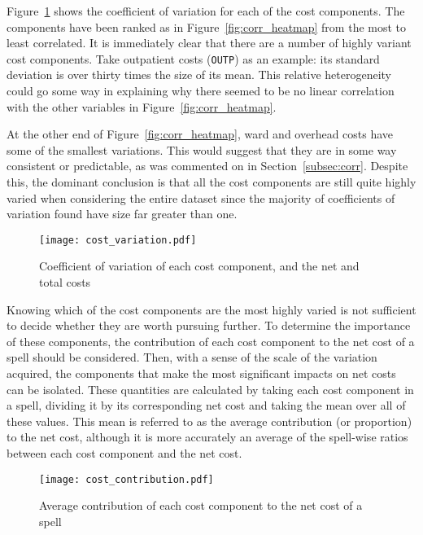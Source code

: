 Figure~\ref{fig:cost_variation} shows the coefficient of variation for each of
the cost components. The components have been ranked as in
Figure~\ref{fig:corr_heatmap} from the most to least correlated. It is
immediately clear that there are a number of highly variant cost components.
Take outpatient costs ({\tt OUTP}) as an example: its standard deviation is over
thirty times the size of its mean. This relative heterogeneity could go some way
in explaining why there seemed to be no linear correlation with the other
variables in Figure~\ref{fig:corr_heatmap}.

At the other end of Figure~\ref{fig:corr_heatmap}, ward and overhead costs have
some of the smallest variations. This would suggest that they are in some way
consistent or predictable, as was commented on in Section~\ref{subsec:corr}.
Despite this, the dominant conclusion is that all the cost components are still
quite highly varied when considering the entire dataset since the majority of
coefficients of variation found have size far greater than one. 

\begin{figure}
    \centering
    \texttt{[image: cost\_variation.pdf]}
    \caption{%
        Coefficient of variation of each cost component, and the net and total
        costs
    }\label{fig:cost_variation}
\end{figure}

Knowing which of the cost components are the most highly varied is not
sufficient to decide whether they are worth pursuing further. To determine the
importance of these components, the contribution of each cost component to the
net cost of a spell should be considered. Then, with a sense of the scale of the
variation acquired, the components that make the most significant impacts on net
costs can be isolated. These quantities are calculated by taking each cost
component in a spell, dividing it by its corresponding net cost and taking the
mean over all of these values. This mean is referred to as the average
contribution (or proportion) to the net cost, although it is more accurately an
average of the spell-wise ratios between each cost component and the net cost.

\begin{figure}
    \centering
    \texttt{[image: cost\_contribution.pdf]}
    \caption{%
        Average contribution of each cost component to the net cost of a spell
    }\label{fig:cost_contribution}
\end{figure}

